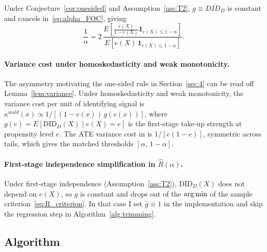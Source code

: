\begin{conjecture}\label{cor:independence}
Under Conjecture~\ref{cor:onesided} and Assumption~\ref{ass:T2}, $g\equiv \overline{DID_D}$ is constant and cancels in~\eqref{eq:alpha_FOC}, giving
\begin{equation}\label{eq:indep_FOC}
    \frac{1}{\alpha}=2\,\frac{E\!\left[\tfrac{e(X)}{1-e(X)}\mathbf 1_{e(X)\le 1-\alpha}\right]}{E\!\left[e(X)\,\mathbf 1_{e(X)\le 1-\alpha}\right]}.
\end{equation}
\end{conjecture}

\paragraph{Variance cost under homoskedasticity and weak monotonicity.} The asymmetry motivating the one-sided rule in Section~\ref{sec:4} can be read off Lemma~\ref{lem:variance}. Under homoskedasticity and weak monotonicity, the variance cost per unit of identifying signal is $\kappa^{wald}(x)\propto 1/[(1-e(x))\,g(e(x))]$, where $g(e) = E[\mathrm{DID}_D(X)\mid e(X)=e]$ is the first-stage take-up strength at propensity level $e$. The ATE variance cost in \citet{crump2009trimming} is $1/[e(1-e)]$, symmetric across tails, which gives the matched thresholds $[\alpha,\,1-\alpha]$.

\paragraph{First-stage independence simplification in $\hat R(\alpha)$.} Under first-stage independence (Assumption~\ref{ass:T2}), $\mathrm{DID}_D(X)$ does not depend on $e(X)$, so $g$ is constant and drops out of the $\operatorname*{arg\,min}$ of the sample criterion~\eqref{eq:R_criterion}. In that case I set $\hat g\equiv 1$ in the implementation and skip the regression step in Algorithm~\ref{alg:trimming}.

\subsection{Algorithm}\label{sec:app_trimming_alg}

